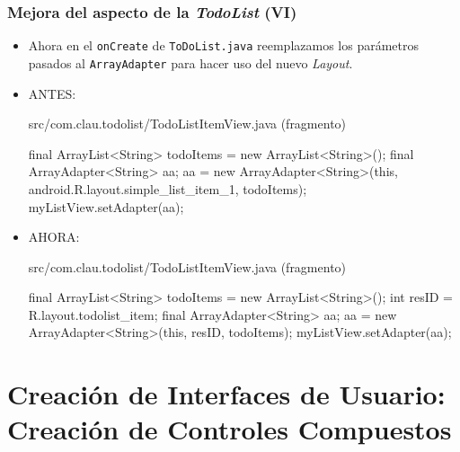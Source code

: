 \documentclass[hyperref={pdfpagelabels=true},ucs]{beamer}
\begin{document}
\begin{frame}[fragile]
\frametitle{Mejora del aspecto de la \emph{TodoList} (VI)}

\begin{itemize}
\item Ahora en el \verb|onCreate| de \verb|ToDoList.java|
  reemplazamos los parámetros pasados al \verb|ArrayAdapter| para
  hacer uso del nuevo \emph{Layout}.
\item ANTES:
\begin{tiny}
\begin{block}{src/com.clau.todolist/TodoListItemView.java (fragmento)}
\begin{java}
  final ArrayList<String> todoItems = new ArrayList<String>();
  final ArrayAdapter<String> aa;
  aa = new ArrayAdapter<String>(this,
    android.R.layout.simple_list_item_1, todoItems);
  myListView.setAdapter(aa);
\end{java}
\end{block}
\end{tiny}

\item \alert{AHORA}:
\begin{tiny}
\begin{block}{src/com.clau.todolist/TodoListItemView.java (fragmento)}
\begin{java}
  final ArrayList<String> todoItems = new ArrayList<String>();
  int resID = R.layout.todolist_item;
  final ArrayAdapter<String> aa;
  aa = new ArrayAdapter<String>(this, resID, todoItems);
  myListView.setAdapter(aa);
\end{java}
\end{block}
\end{tiny}

\end{itemize}


\end{frame}

\section[Creación de IU: Creación de Controles Compuestos]{Creación de Interfaces de Usuario: Creación de Controles Compuestos}
\end{document}
